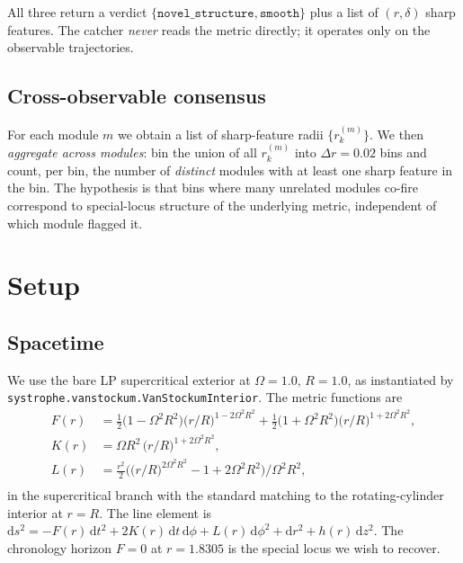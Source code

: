 \documentclass[11pt,letterpaper]{article}
\begin{document}
All three return a verdict $\{\mathtt{novel\_structure}, \mathtt{smooth}\}$ plus a list of $(r, \delta)$ sharp features. The catcher \emph{never} reads the metric directly; it operates only on the observable trajectories.

\subsection{Cross-observable consensus}\label{ssec:consensus}

For each module $m$ we obtain a list of sharp-feature radii $\{r^{(m)}_k\}$. We then \emph{aggregate across modules}: bin the union of all $r^{(m)}_k$ into $\Delta r = 0.02$ bins and count, per bin, the number of \emph{distinct} modules with at least one sharp feature in the bin. The hypothesis is that bins where many unrelated modules co-fire correspond to special-locus structure of the underlying metric, independent of which module flagged it.

\section{Setup}\label{sec:setup}

\subsection{Spacetime}\label{ssec:spacetime}

We use the bare LP supercritical exterior at $\Omega = 1.0,\, R = 1.0$, as instantiated by \texttt{systrophe.vanstockum.VanStockumInterior}. The metric functions are
\begin{align*}
F(r) &= \tfrac{1}{2}\bigl(1 - \Omega^2 R^2\bigr)\bigl(r/R\bigr)^{1 - 2\Omega^2 R^2} + \tfrac{1}{2}\bigl(1 + \Omega^2 R^2\bigr)\bigl(r/R\bigr)^{1 + 2\Omega^2 R^2}, \\
K(r) &= \Omega R^2 \, \bigl(r/R\bigr)^{1 + 2\Omega^2 R^2}, \\
L(r) &= \tfrac{r^2}{2}\bigl(\bigl(r/R\bigr)^{2\Omega^2 R^2} - 1 + 2\Omega^2 R^2\bigr) / \Omega^2 R^2, \\
\end{align*}
in the supercritical branch with the standard matching to the rotating-cylinder interior at $r = R$. The line element is
$\mathrm{d}s^2 = -F(r) \, \mathrm{d}t^2 + 2 K(r) \, \mathrm{d}t \, \mathrm{d}\phi + L(r) \, \mathrm{d}\phi^2 + \mathrm{d}r^2 + h(r) \, \mathrm{d}z^2$. The chronology horizon $F = 0$ at $r = 1.8305$ is the special locus we wish to recover.
\end{document}

